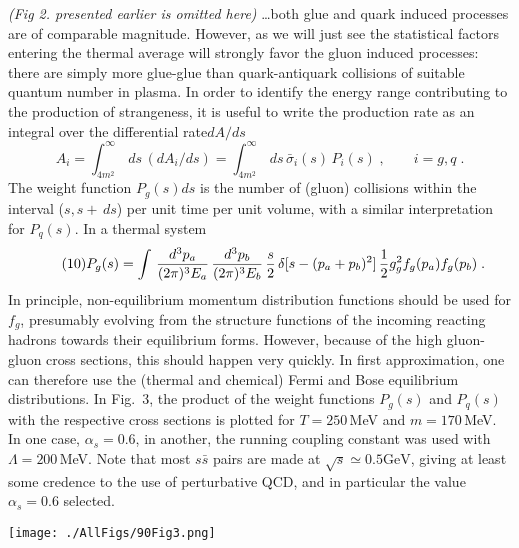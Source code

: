 \begin{mdframed}[linecolor=gray,roundcorner=12pt,backgroundcolor=Dandelion!15,linewidth=1pt,leftmargin=0cm,rightmargin=0cm,topline=true,bottomline=true,skipabove=12pt]
\textit{(Fig 2. presented earlier is omitted here)} \ldots both glue and quark induced processes are of comparable magnitude\footnotemark[9]. However, as we will just see the statistical factors entering the thermal average will strongly favor the gluon induced processes: there are simply more glue-glue than quark-antiquark collisions of suitable quantum number in plasma. In order to identify the energy range contributing to the production of strangeness, it is useful to write the production rate as an integral over the differential rate\footnotemark[9] $dA/ds$ 
\begin{equation}\label{gf}\tag{9}
A_i = \int_{4m^2}^\infty\,ds\,(dA_i/ds) =
\int_{4m^2}^\infty\,ds\,\bar\sigma_i(s)\, P_i(s)\;, \qquad i = g,q\;.
\end{equation}
The weight function $P_g(s)ds$ is the number of (gluon) collisions within the interval ($s,s+\,ds$) per unit time per unit volume, with a similar interpretation for $P_q(s)$. In a thermal system
\begin{equation}\label{gma}\tag{10}
P_g(s) = \int\,{d^3p_a\over (2\pi)^3E_a}\,
{d^3p_b\over (2\pi)^3E_b}\, {s\over 2} \,
\delta[s-(p_a+p_b)^2]\,{1\over 2}g_g^2 f_g(p_a)f_g(p_b)\;.
\end{equation}
In principle, non-equilibrium momentum distribution functions should be used for $f_g$, presumably evolving from the structure functions of the incoming reacting hadrons towards their equilibrium forms. However, because of the high gluon-gluon cross sections, this should happen very quickly\footnotemark[18,19]. In first approximation, one can therefore use the (thermal and chemical) Fermi and Bose equilibrium distributions. In Fig.~3, the product of the weight functions $P_g(s)$ and $P_q(s)$ with the respective cross sections is plotted for $T= 250$\,MeV and $m = 170$\,MeV. In one case, $\alpha_s = 0.6$, in another, the running coupling constant was used with $\Lambda = 200$\,MeV. Note that most $s\bar s$ pairs are made at $\sqrt{s} \simeq 0.5 \mathrm{GeV}$, giving at least some credence to the use of perturbative QCD, and in particular the value $\alpha_s = 0.6$ selected.


\centerline{
\texttt{[image: ./AllFigs/90Fig3.png]}
} 


\end{mdframed}
